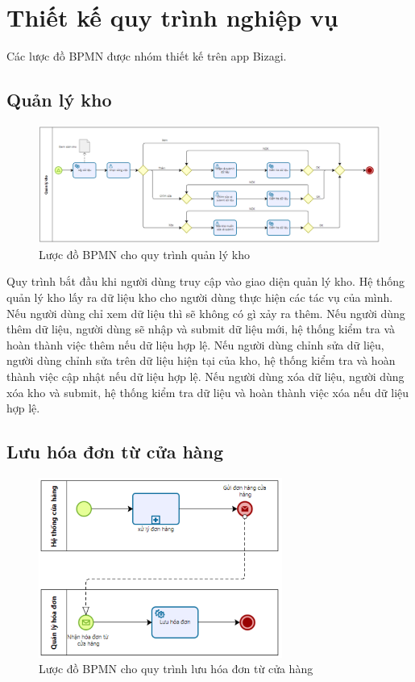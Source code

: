 \section{Thiết kế quy trình nghiệp vụ}

Các lược đồ BPMN được nhóm thiết kế trên app Bizagi.

\subsection{Quản lý kho}
\begin{figure}[!htp]
	\centering
	\includegraphics[width=17cm]{img/BPMN/Tho/warehouse.PNG}
	\newline
	\caption{Lược đồ BPMN cho quy trình quản lý kho}
\end{figure}

Quy trình bắt đầu khi người dùng truy cập vào giao diện quản lý kho. Hệ thống quản lý kho lấy ra dữ liệu kho cho người dùng thực hiện các tác vụ của mình. Nếu người dùng chỉ xem dữ liệu thì sẽ không có gì xảy ra thêm. Nếu người dùng thêm dữ liệu, người dùng sẽ nhập và submit dữ liệu mới, hệ thống kiểm tra và hoàn thành việc thêm nếu dữ liệu hợp lệ. Nếu người dùng chỉnh sửa dữ liệu, người dùng chỉnh sửa trên dữ liệu hiện tại của kho, hệ thống kiểm tra và hoàn thành việc cập nhật nếu dữ liệu hợp lệ. Nếu người dùng xóa dữ liệu, người dùng xóa kho và submit, hệ thống kiểm tra dữ liệu và hoàn thành việc xóa nếu dữ liệu hợp lệ.

\subsection{Lưu hóa đơn từ cửa hàng}
\begin{figure}[!htp]
	\centering
	\includegraphics[width=8cm]{img/BPMN/Tho/save_invoice.PNG}
	\newline
	\caption{Lược đồ BPMN cho quy trình lưu hóa đơn từ cửa hàng}
\end{figure}

